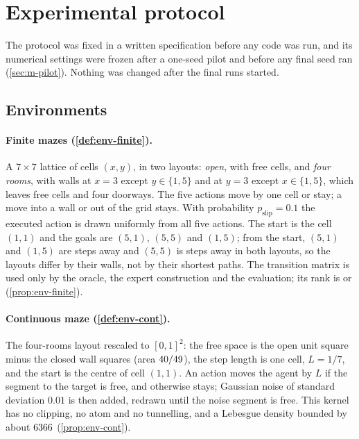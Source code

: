 \section{Experimental protocol}\label{sec:protocol}

The protocol was fixed in a written specification before any code was run, and its numerical settings were frozen after a one-seed pilot and before any final seed ran (\cref{sec:m-pilot}). Nothing was changed after the final runs started.

\subsection{Environments}

\paragraph{Finite mazes (\cref{def:env-finite}).}
A $7\times7$ lattice of cells $(x,y)$, in two layouts: \emph{open}, with  free cells, and \emph{four rooms}, with walls at $x=3$ except $y\in\{1,5\}$ and at $y=3$ except $x\in\{1,5\}$, which leaves  free cells and four doorways.
The five actions move by one cell or stay; a move into a wall or out of the grid stays.
With probability $p_{\mathrm{slip}}=0.1$ the executed action is drawn uniformly from all five actions.
The start is the cell $(1,1)$ and the goals are $(5,1)$, $(5,5)$ and $(1,5)$; from the start, $(5,1)$ and $(1,5)$ are  steps away and $(5,5)$ is  steps away in both layouts, so the layouts differ by their walls, not by their shortest paths.
The transition matrix is used only by the oracle, the expert construction and the evaluation; its rank is  or  (\cref{prop:env-finite}).

\paragraph{Continuous maze (\cref{def:env-cont}).}
The four-rooms layout rescaled to $[0,1]^2$: the free space is the open unit square minus the closed wall squares (area $\vn{env.cells.4r}{40}/\vn{env.cells.open}{49}$), the step length is one cell, $L=1/7$, and the start is the centre of cell $(1,1)$.
An action moves the agent by $L$ if the segment to the target is free, and otherwise stays; Gaussian noise of standard deviation $0.01$ is then added, redrawn until the noise segment is free.
This kernel has no clipping, no atom and no tunnelling, and a Lebesgue density bounded by about $\vn{const.p_max}{6366}$ (\cref{prop:env-cont}).

